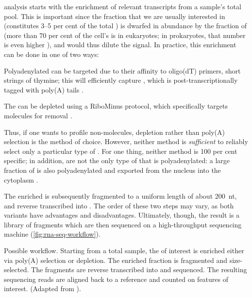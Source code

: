 \rnaseq analysis starts with the enrichment of relevant transcripts from a
sample’s total \rna pool. This is important since the \rna fraction that we are
usually interested in (\mrna constitutes \numrange{3}{5} per cent of the total
\rna \citep{Alberts:2002}) is dwarfed in abundance by the fraction of \rrna
(more than \num{70} per cent of the cell’s \rna is \rrna in eukaryotes; in
prokaryotes, that number is even higher \citep{Sittman:1999}), and would thus
dilute the signal. In practice, this enrichment can be done in one of two ways:
\begin{enumerate*}
    \item Polyadenylated \rna can be targeted due to their affinity to oligo(dT)
        primers, short strings of thymine; this will efficiently capture \mrna,
        which is post-transcriptionally \threep tagged with poly(A)
        tails \citep{Mortazavi:2008}.
    \item The \rna can be \rrna depleted using a RiboMinus protocol, which
        specifically targets \rrna molecules for removal \citep{Cui:2010}.
\end{enumerate*}
Thus, if one wants to profile non-\mrna molecules, \rrna depletion rather than
poly(A) selection is the method of choice. However, neither method is
\emph{sufficient} to reliably select only a particular type of \rna. For one
thing, neither method is \num{100} per cent specific; in addition, \mrna[s] are
not the only type of \rna that is polyadenylated: a large fraction of \ncrna is
also polyadenylated and exported from the nucleus into the cytoplasm
\citep{Cheng:2005}.

The enriched \rna is subsequently fragmented to a uniform length of about
\SI{200}{nt}, and reverse transcribed into \cdna. The order of these two steps
may vary, as both variants have advantages and disadvantages. Ultimately,
though, the result is a \cdna library of fragments which are then sequenced on a
high-throughput sequencing machine (\cref{fig:rna-seq-workflow}).

    {Possible \rnaseq workflow.}
    {Starting from a total \rna sample, the \rna of interest is enriched either
    via poly(A) selection or \rrna depletion. The enriched fraction is
    fragmented and size-selected. The fragments are reverse transcribed into
    \cdna and sequenced. The resulting sequencing reads are aligned back to a
    reference and counted on features of interest. (Adapted from
    \citet{Mortazavi:2008}).}

